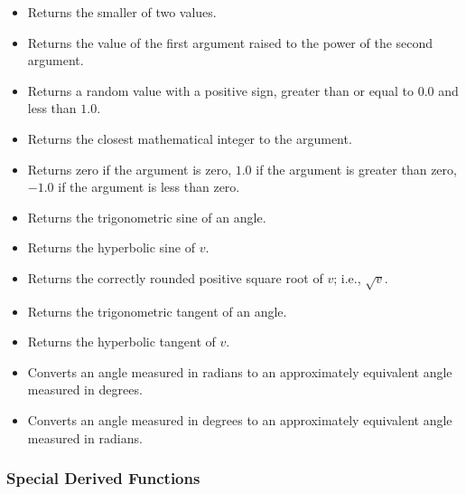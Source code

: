 \documentclass{article}
\begin{document}
\begin{itemize}
\item {\bf {} }   Returns the smaller of two values.
\item {\bf {} }   Returns the value of the first argument raised to the power of the second argument.
\item {\bf {} }   Returns a random value with a positive sign, greater than or equal to $0.0$ and less than $1.0$.
\item {\bf {} }   Returns the closest mathematical integer to the argument.
\item {\bf {} }  Returns zero if the argument is zero, $1.0$ if the argument is greater than zero, $-1.0$ if the argument is less than zero.
\item {\bf {} }   Returns the trigonometric sine of an angle.
\item {\bf {} }   Returns the hyperbolic sine of $v$.
\item {\bf {} }   Returns the correctly rounded positive square root of $v$; i.e., $\sqrt{v}$.
\item {\bf {} }   Returns the trigonometric tangent of an angle.
\item {\bf {} }   Returns the hyperbolic tangent of $v$.
\item {\bf {} }   Converts an angle measured in radians to an approximately equivalent angle measured in degrees.
\item {\bf {} }   Converts an angle measured in degrees to an approximately equivalent angle measured in radians.
\end{itemize}

\subsubsection{Special Derived Functions}
\end{document}
